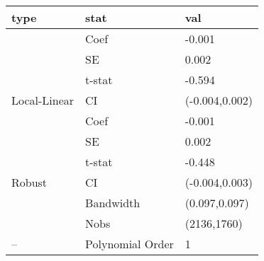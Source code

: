 
\begin{tabular}{lll}
\toprule
type & stat & val\\
\midrule
 & Coef & -0.001\\

 & SE & 0.002\\

 & t-stat & -0.594\\

\multirow{-4}{*}{\raggedright\arraybackslash Local-Linear} & CI & (-0.004,0.002)\\
\cmidrule{1-3}
 & Coef & -0.001\\

 & SE & 0.002\\

 & t-stat & -0.448\\

\multirow{-4}{*}{\raggedright\arraybackslash Robust} & CI & (-0.004,0.003)\\
\cmidrule{1-3}
 & Bandwidth & (0.097,0.097)\\

 & Nobs & (2136,1760)\\

\multirow{-3}{*}{\raggedright\arraybackslash --} & Polynomial Order & 1\\
\bottomrule
\end{tabular}